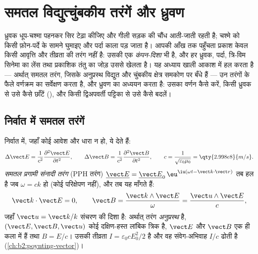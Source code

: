 \chapter{समतल विद्युत्चुंबकीय तरंगें और ध्रुवण}\label{ch:b2:plane-waves-polarization}

ध्रुवक धूप-चश्मा पहनकर सिर टेढ़ा कीजिए और गीली सड़क की चौंध आती-जाती
रहती है; चश्मे को किसी फ़ोन-पर्दे के सामने घुमाइए और पर्दा काला पड़
जाता है। आपकी आँख तक पहुँचता प्रकाश केवल किसी आवृत्ति और तीव्रता की तरंग
नहीं है: उसकी एक \emph{कंपन-दिशा} भी है, और हर ध्रुवक, पर्दा, त्रि-विम
सिनेमा का लेंस तथा प्रकाशिक तंतु का जोड़ उससे खेलता है। यह अध्याय खाली
आकाश में  हल करता है --- अर्थात् समतल तरंग, जिसके
अनुप्रस्थ विद्युत और चुंबकीय क्षेत्र समकोण पर बँधे हैं --- उन तरंगों के
फैले वर्णक्रम का सर्वेक्षण करता है, और ध्रुवण का अध्ययन करता है: उसका
वर्णन कैसे करें, किसी ध्रुवक से उसे कैसे छाँटें (), और किसी
द्विअपवर्ती पट्टिका से उसे कैसे बदलें।

\section{निर्वात में समतल तरंगें}

\begin{theorem}\label{thm:b2:plane-waves-polarization:wave}
निर्वात में, जहाँ कोई आवेश और धारा न हो,  ये देते हैं:
\[
\Delta\vect E = \frac1{c^2}\frac{\partial^2\vect E}{\partial t^2} , \qquad
\Delta\vect B = \frac1{c^2}\frac{\partial^2\vect B}{\partial t^2} , \qquad
c = \frac1{\sqrt{\varepsilon_0\mu_0}} = \qty{2.998e8}{m/s} .
\]
\emph{समतल प्रगामी संनादी तरंग} (PPH तरंग) $\underline{\vect E} =
\underline{\vect E}_0\,\eu^{\iu(\omega t - \vect k\cdot\vect r)}$ तब हल है जब
$\omega = ck$ हो (कोई परिक्षेपण नहीं), और तब  यह माँगते हैं:
\[
\vect k\cdot\vect E = 0 , \qquad
\vect B = \frac{\vect k\wedge\vect E}\omega = \frac{\vect u\wedge\vect E}c ,
\]
जहाँ $\vect u = \vect k/k$ संचरण की दिशा है: अर्थात् तरंग
\emph{अनुप्रस्थ} है, $(\vect E, \vect B, \vect u)$ कोई दक्षिण-हस्त लांबिक
त्रिक है, $\vect E$ और $\vect B$ एक ही कला में हैं तथा $B = E/c$। उसकी तीव्रता
$I = \varepsilon_0cE_0^2/2$ है और वह संवेग-अभिवाह $I/c$ ढोती है
(\cref{ch:b2:poynting-vector})।
\end{theorem}

